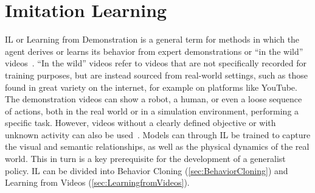 \section{Imitation Learning} \label{sec:ImitationLearning}
\ac{IL} or Learning from Demonstration is a general term for methods in which the agent derives or learns its behavior from expert demonstrations or ``in the wild'' videos~\cite{Chrysomallis2025ImitationLI}. ``In the wild'' videos refer to videos that are not specifically recorded for training purposes, but are instead sourced from real-world settings, such as those found in great variety on the internet, for example on platforms like YouTube.
The demonstration videos can show a robot, a human, or even a loose sequence of actions, both in the real world or in a simulation environment, performing a specific task. However, videos without a clearly defined objective or with unknown activity can also be used~\cite{McCarthy_2025}.
Models can through \ac{IL} be trained to capture the visual and semantic relationships, as well as the physical dynamics of the real world. This in turn is a key prerequisite for the development of a generalist policy. 
\ac{IL} can be divided into Behavior Cloning (\autoref{sec:BehaviorCloning}) and Learning from Videos (\autoref{sec:LearningfromVideos}).


